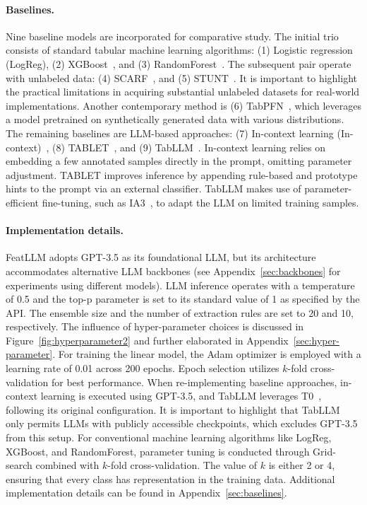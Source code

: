 \vspace*{-0.12in}
\paragraph{Baselines.}
Nine baseline models are incorporated for comparative study. The initial trio consists of standard tabular machine learning algorithms: (1) Logistic regression (LogReg), (2) XGBoost~\cite{chen2016xgboost}, and (3) RandomForest~\cite{ho1995random}. The subsequent pair operate with unlabeled data: (4) SCARF~\cite{bahri2022scarf}, and (5) STUNT~\cite{nam2023stunt}. It is important to highlight the practical limitations in acquiring substantial unlabeled datasets for real-world implementations. Another contemporary method is (6) TabPFN~\cite{hollmann2022tabpfn}, which leverages a model pretrained on synthetically generated data with various distributions. The remaining baselines are LLM-based approaches: (7) In-context learning (In-context)~\cite{wei2022emergent}, (8) TABLET~\cite{slack2023tablet}, and (9) TabLLM~\cite{hegselmann2023tabllm}. In-context learning relies on embedding a few annotated samples directly in the prompt, omitting parameter adjustment. TABLET improves inference by appending rule-based and prototype hints to the prompt via an external classifier. TabLLM makes use of parameter-efficient fine-tuning, such as IA3~\cite{liu2022few}, to adapt the LLM on limited training samples.

\vspace*{-0.12in}
\paragraph{Implementation details.}
\textsf{FeatLLM} adopts GPT-3.5 as its foundational LLM, but its architecture accommodates alternative LLM backbones (see Appendix~\ref{sec:backbones} for experiments using different models). LLM inference operates with a temperature of 0.5 and the top-p parameter is set to its standard value of 1 as specified by the API. The ensemble size and the number of extraction rules are set to 20 and 10, respectively. The influence of hyper-parameter choices is discussed in Figure~\ref{fig:hyperparameter2} and further elaborated in Appendix~\ref{sec:hyper-parameter}. For training the linear model, the Adam optimizer is employed with a learning rate of 0.01 across 200 epochs. Epoch selection utilizes $k$-fold cross-validation for best performance. When re-implementing baseline approaches, in-context learning is executed using GPT-3.5, and TabLLM leverages T0~\cite{sanh2022multitask}, following its original configuration. It is important to highlight that TabLLM only permits LLMs with publicly accessible checkpoints, which excludes GPT-3.5 from this setup. For conventional machine learning algorithms like LogReg, XGBoost, and RandomForest, parameter tuning is conducted through Grid-search combined with $k$-fold cross-validation. The value of $k$ is either 2 or 4, ensuring that every class has representation in the training data. Additional implementation details can be found in Appendix~\ref{sec:baselines}.

